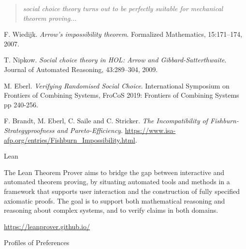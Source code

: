 \documentclass[12pt,xcolor=svgnames,blue,aspectratio=169]{beamer}
\newcommand{\paper}[3]{\colorbox{gray!20}{%
\begin{minipage}{\textwidth}\footnotesize #1.
\textit{#2}. #3.\end{minipage}}}
\begin{document}
\begin{frame}

\begin{quote}
\textit{social choice theory turns out to be perfectly suitable for mechanical theorem proving...}
\end{quote}
\vfill
\paper{F. Wiedijk}{Arrow's impossibility theorem}{Formalized Mathematics, 15:171–174, 2007}
\vfill

\paper{T. Nipkow}{Social choice theory in HOL: Arrow and Gibbard-Satterthwaite}{Journal of Automated Reasoning, 43:289–304, 2009}
\vfill

\paper{M. Eberl}{Verifying Randomised Social Choice}{International Symposium on Frontiers of Combining Systems, FroCoS 2019: Frontiers of Combining Systems pp 240-256}

\vfill

\paper{F. Brandt, M. Eberl, C. Saile and C. Stricker}{The Incompatibility of Fishburn-Strategyproofness and Pareto-Efficiency}{\url{https://www.isa-afp.org/entries/Fishburn_Impossibility.html}}
\end{frame}

\begin{frame}{Lean}

The Lean Theorem Prover aims to bridge the gap between interactive and automated theorem proving, by situating automated tools and methods in a framework that supports user interaction and the construction of fully specified axiomatic proofs. The goal is to support both mathematical reasoning and reasoning about complex systems, and to verify claims in both domains.


\vfill

\url{https://leanprover.github.io/}
\end{frame}

\begin{frame}


{\Huge Profiles of Preferences}


\end{frame}
\end{document}
